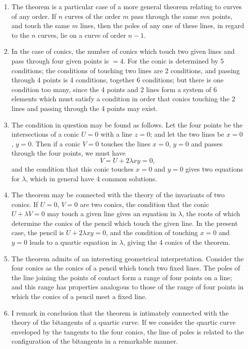 \documentclass[12pt,a4paper]{article}
\theoremstyle{plain}
\theoremstyle{definition}
\theoremstyle{remark}
\begin{document}
\begin{enumerate}[label=\arabic*.]
\item The theorem is a particular case of a more general theorem relating to curves of any order. If $n$ curves of the order $m$ pass through the same $mn$ points, and touch the same $m$ lines, then the poles of any one of these lines, in regard to the $n$ curves, lie on a curve of order $n-1$.

\item In the case of conics, the number of conics which touch two given lines and pass through four given points is $= 4$. For the conic is determined by 5 conditions; the conditions of touching two lines are 2 conditions, and passing through 4 points is 4 conditions, together 6 conditions; but there is one condition too many, since the 4 points and 2 lines form a system of 6 elements which must satisfy a condition in order that conics touching the 2 lines and passing through the 4 points may exist.

\item The condition in question may be found as follows. Let the four points be the intersections of a conic $U = 0$ with a line $z = 0$; and let the two lines be $x = 0$, $y = 0$. Then if a conic $V = 0$ touches the lines $x = 0$, $y = 0$ and passes through the four points, we must have
\[V = U + 2\lambda xy = 0,\]
and the condition that this conic touches $x = 0$ and $y = 0$ gives two equations for $\lambda$, which in general have 4 common solutions.

\item The theorem may be connected with the theory of the invariants of two conics. If $U = 0$, $V = 0$ are two conics, the condition that the conic $U + \lambda V = 0$ may touch a given line gives an equation in $\lambda$, the roots of which determine the conics of the pencil which touch the given line. In the present case, the pencil is $U + 2\lambda xy = 0$, and the condition of touching $x = 0$ and $y = 0$ leads to a quartic equation in $\lambda$, giving the 4 conics of the theorem.

\item The theorem admits of an interesting geometrical interpretation. Consider the four conics as the conics of a pencil which touch two fixed lines. The poles of the line joining the points of contact form a range of four points on a line; and this range has properties analogous to those of the range of four points in which the conics of a pencil meet a fixed line.

\item I remark in conclusion that the theorem is intimately connected with the theory of the bitangents of a quartic curve. If we consider the quartic curve enveloped by the tangents to the four conics, the line of poles is related to the configuration of the bitangents in a remarkable manner.
\end{enumerate}
\end{document}
